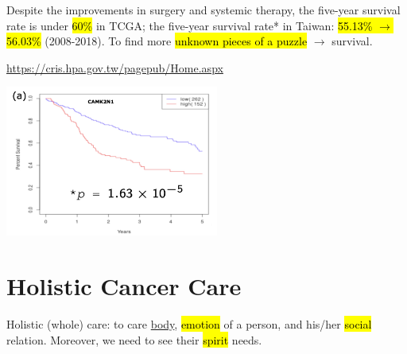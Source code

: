 \documentclass[
paper=landscape,
paper=160mm:90mm, %
fontsize=11pt, %
pagesize, %
parskip=half-, %
]{scrartcl} %
\theoremstyle{mythmstyle} %
\begin{document}
\begin{minipage}[c]{0.40\linewidth}
\begin{outline}
\0
\0 Despite the improvements in surgery and systemic therapy,
        \1 the five-year survival rate is under \hl{60\%} in TCGA;
        \1 the five-year survival rate* in Taiwan: \hl{55.13\% $\longrightarrow$ 56.03\%}  (2008-2018).
\0 To find more \hl{unknown pieces of a puzzle} $\longrightarrow$ survival.
\end{outline}

    {\tiny *\url{https://cris.hpa.gov.tw/pagepub/Home.aspx}}
\end{minipage}%
\begin{minipage}[c]{0.55\linewidth}
    \raggedright
    \hfill\includegraphics[width=7cm]{KMplot_CAMK2N1.pdf}
\end{minipage}




\clearpage



\section{Holistic Cancer Care} 

\thispagestyle{headings}

Holistic (whole) care: to care \underline{body}, \hl{emotion} of a person, and his/her \hl{social} relation. Moreover, we need to see their \hl{spirit} needs.
\end{document}
